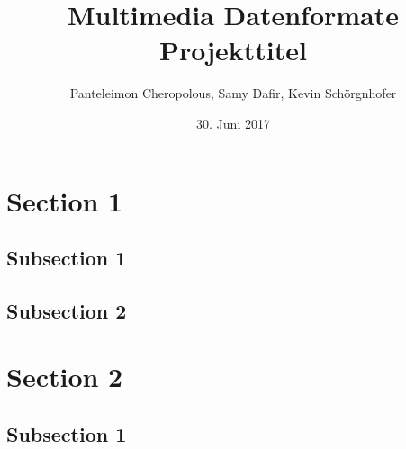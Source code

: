 \documentclass{beamer}
\begin{document}
\title{Multimedia Datenformate \\
Projekttitel}
\author{Panteleimon Cheropolous, Samy Dafir, Kevin Schörgnhofer}
\date{30. Juni 2017}

\frame{\titlepage}


\section{Section 1}
\subsection{Subsection 1}

\subsection{Subsection 2}

\section{Section 2}
\subsection{Subsection 1}
\end{document}
